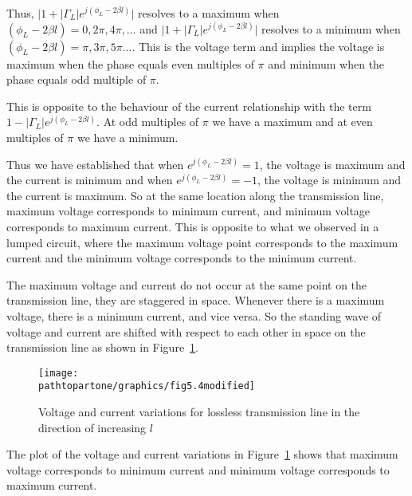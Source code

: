 Thus, $\lvert 1 + \lvert\Gamma_L\rvert e^{j (\phi_L - 2\beta l)}\rvert$ resolves to a maximum when $(\phi_L - 2\beta l) = 0, 2\pi, 4\pi, \ldots$ and $\lvert 1 + \lvert\Gamma_L\rvert e^{j (\phi_L - 2\beta l)}\rvert$ resolves to a minimum when $(\phi_L -2\beta l) = \pi, 3\pi, 5\pi \ldots$. This is the voltage term and implies the voltage is maximum when the phase equals even multiples of $\pi$ and minimum when the phase equals odd multiple of $\pi$.

This is opposite to the behaviour of the current relationship with the term $1-|\Gamma_L| e^{j(\phi_L -2\beta l)}$. At odd multiples of $\pi$ we have a maximum and at even multiples of $\pi$ we have a minimum.

Thus we have established that when $ e^{j(\phi_L - 2 \beta l)} = 1$, the voltage is maximum and the current is minimum and when $ e^{j(\phi_L - 2 \beta l)} = -1$, the voltage is minimum and the current is maximum. So at the same location along the transmission line, maximum voltage corresponds to minimum current, and minimum voltage corresponds to maximum current. This is opposite to what we observed in a lumped circuit, where the maximum voltage point corresponds to the maximum current and the minimum voltage corresponds to the minimum current.

The maximum voltage and current do not occur at the same point on the transmission line, they are staggered in space. Whenever there is a maximum voltage, there is a minimum current, and vice versa. So the standing wave of voltage and current are shifted with respect to each other in space on the transmission line as shown in Figure~\ref{fig:asdfghjhgfdsa}. 
\begin{figure}[h]
\centering
\texttt{[image: \\pathtopartone/graphics/fig5.4modified]}
\caption{Voltage and current variations for lossless transmission line in the direction of increasing $l$}
\label{fig:asdfghjhgfdsa}
\end{figure}

The plot of the voltage and current variations in Figure~\ref{fig:asdfghjhgfdsa} shows that maximum voltage corresponds to minimum current and minimum voltage corresponds to maximum current.

